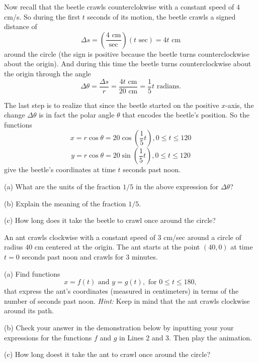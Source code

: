 \documentclass{ximera}
\begin{document}
Now recall that the beetle crawls counterclokwise with a constant speed of $4$ cm/s.  So during the first $t$ seconds of its motion, the beetle crawls a signed distance of
\[
   \Delta  s = \left( \frac{4 \text{ cm}}{\text{sec}} \right) (t \text{ sec}) = 4t \text{ cm}  
\]
around the circle (the sign is positive because the beetle turns counterclockwise about the origin). And during this time the beetle turns counterclockwise about the origin through the angle
\[
    \Delta \theta = \frac{\Delta s}{r} = \frac{4t \text{ cm}}{20 \text{ cm}} = \frac{1}{5}t \text{ radians}.
\]

The last step is to realize that since the beetle started on the positive $x$-axis, the change $\Delta \theta$  is in fact the polar angle $\theta$ that encodes the beetle's position. So the functions
\[
    x = r\cos \theta = 20 \cos \left( \frac{1}{5}t \right) , 0\leq t \leq 120
\]
\[
    y = r\cos \theta = 20 \sin \left( \frac{1}{5}t \right) , 0\leq t \leq 120
\]
give the beetle's coordinates at time $t$ seconds past noon.


\begin{question}  \label{Qgf45365:Motion1}
(a) What are the units of the fraction $1/5$ in the above expression for $\Delta \theta$?

(b) Explain the meaning of the fraction $1/5$.

(c) How long does it take the beetle to crawl once around the circle?
\end{question}


\begin{question}  \label{Q345tds5:Motion1}
An ant crawls clockwise with a constant speed of $3$ cm/sec around a circle of radius $40$ cm centered at the origin. The ant starts at the point $(40,0)$ at time $t=0$ seconds past noon and crawls for $3$ minutes.

(a) Find functions
\[
   x = f(t) \text{ and } y=g(t) , \text{ for } 0\leq t \leq 180 ,
\]
that express the ant's coordinates (measured in centimeters) in terms of the number of seconds past noon. {\it Hint:} Keep in mind that the ant crawls clockwise around its path.

(b) Check your answer in the demonstration below by inputting your your expressions for the functions $f$ and $g$ in Lines 2 and 3. Then play the animation.

(c) How long doest it take the ant to crawl once around the circle?

 
\begin{onlineOnly}
    \begin{center}
\end{center}
\end{onlineOnly}


\end{question}
\end{document}
